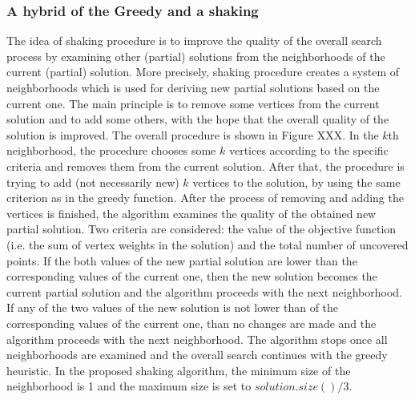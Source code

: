 \documentclass[runningheads,a4paper]{elsarticle}
\begin{document}
	\subsubsection{A hybrid of the Greedy and a shaking}
The idea of shaking procedure is to improve the quality of the overall search process by examining other (partial) solutions from the neighborhoods of the current (partial) solution. More precisely,
shaking procedure creates a system of neighborhoods which is used for deriving new partial solutions based on the current one. The main principle  is to remove some vertices from the current solution and to add some others, with the hope that the overall quality of the solution is improved.
 The overall procedure is shown in Figure XXX. In the $k$th neighborhood, the procedure chooses some $k$ vertices according to the specific criteria and removes them from the current solution. After that, the procedure is trying to add (not necessarily new) $k$ vertices to the solution, by using the same criterion as in the greedy function. After the process of removing and adding the vertices is finished, the algorithm examines the quality of the obtained new partial solution. Two criteria are considered: the value of the objective function (i.e. the sum of vertex weights in the solution) and the total number of uncovered points. If the both values of the new partial solution are lower  than the corresponding values of the current one, then the new solution becomes the current partial solution and the algorithm proceeds with the next neighborhood. If any of the two values of the new solution is not lower than of the corresponding values of the current one, than no changes are made and the algorithm proceeds with the next neighborhood. The algorithm stops once all neighborhoods are examined and the overall search continues with the greedy heuristic. In the proposed shaking algorithm, the minimum size of the neighborhood is 1 and the maximum size is set to $solution.size()/3$.
\end{document}
